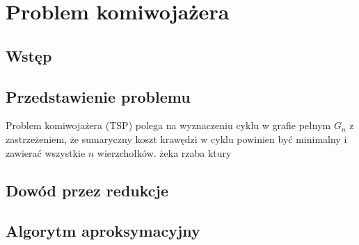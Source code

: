\chapter{Problem komiwojażera}

\section{Wstęp}

\section{Przedstawienie problemu}

Problem komiwojażera (TSP) polega na wyznaczeniu cyklu w grafie pełnym $G_{n}$ z zastrzeżeniem, że sumaryczny koszt krawędzi w cyklu powinien być minimalny i zawierać wszystkie $n$ wierzchołków. żeka rzaba ktury   

\section{Dowód przez redukcje}

\section{Algorytm aproksymacyjny}